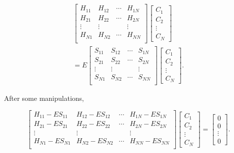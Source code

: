 \documentclass[a4paper, 12pt, titlepage,oneside,drop]{kthesis}
\begin{document}
\begin{equation}\begin{split}\label{ep4}
\left[
\begin{matrix}
    H_{11} & H_{12} & \cdots & H_{1N} \\
    H_{21} & H_{22} & \cdots & H_{2N} \\
    \vdots               & \vdots               &        & \vdots               \\
     H_{N1} & H_{N2} & \cdots & H_{NN} \\
\end{matrix} \right] \left[ \begin{array}{c} C_1 \\ C_2 \\ \vdots \\ C_N\end{array} \right] \\
=E \left[
\begin{matrix}
    S_{11} & S_{12} & \cdots & S_{1N} \\
    S_{21} & S_{22} & \cdots & S_{2N} \\
    \vdots               & \vdots               &        & \vdots               \\
     S_{N1} & S_{N2} & \cdots & S_{NN} \\
\end{matrix} \right]\left[ \begin{array}{c} C_1 \\ C_2 \\ \vdots \\ C_N\end{array} \right].
\end{split}\end{equation}

After some manipulations, 

\begin{equation}\label{ep44}
\left[
\begin{matrix}
    H_{11} - E S_{11} & H_{12} - E S_{12} & \cdots & H_{1N} - E S_{1N} \\
   H_{21} - E S_{21} & H_{22} - E S_{22} & \cdots & H_{2N} - E S_{2N} \\
    \vdots               & \vdots               &        & \vdots               \\
  H_{N1} - E S_{N1} & H_{N2} - E S_{N2} & \cdots & H_{NN} - E S_{NN} \\
\end{matrix} \right] \left[ \begin{array}{c} C_1 \\ C_2 \\ \vdots \\ C_N\end{array} \right]
=\left[ \begin{array}{c} 0 \\ 0 \\ \vdots \\ 0 \end{array} \right].
\end{equation}
\end{document}
